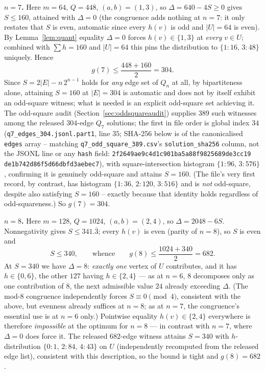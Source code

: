 \documentclass[12pt]{article}
\begin{document}
\textbf{$n=7$.} Here $m=64$, $Q=448$, $(a,b)=(1,3)$, so
$\Delta=640-4S\ge0$ gives $S\le160$, attained with $\Delta=0$ (the
congruence adds nothing at $n=7$: it only restates that $S$ is even,
automatic since every $h(v)$ is odd and $|U|=64$ is even). By
Lemma~\ref{lem:quant} equality $\Delta=0$ forces $h(v)\in\{1,3\}$ at
\emph{every} $v\in U$; combined with $\sum h=160$ and $|U|=64$ this
pins the distribution to $\{1{:}16,\,3{:}48\}$ uniquely. Hence
\[
g(7)\le\frac{448+160}{2}=304 .
\]
Since $S=2|E|-n\,2^{n-1}$ holds for \emph{any} edge set of $Q_n$ at all,
by bipartiteness alone, attaining $S=160$ at $|E|=304$ is automatic
and does not by itself exhibit an odd-square witness; what is needed is
an explicit odd-square set achieving it. The odd-square audit
(Section~\ref{sec:oddsquareaudit}) supplies $389$ such witnesses among
the released $304$-edge $Q_7$ solutions; the first in file order is
global index $34$ (\texttt{q7\_edges\_304.jsonl.part1}, line $35$; SHA-256
below is of the canonicalised \texttt{edges} array -- matching
\texttt{q7\_odd\_square\_389.csv}'s \texttt{solution\_sha256} column,
not the JSONL line or any \texttt{hash} field:
\texttt{2f2649ae9c4d1c901ba5a88f9825689de3cc19\allowbreak
de1b742d86f5d66dbfd3aebec7}), with square-intersection histogram $\{1{:}96,\,3{:}576\}$,
confirming it is genuinely odd-square and attains $S=160$. (The file's
very first record, by contrast, has histogram
$\{1{:}36,\,2{:}120,\,3{:}516\}$ and is \emph{not} odd-square, despite
also satisfying $S=160$ -- exactly because that identity holds
regardless of odd-squareness.) So $g(7)=304$.

\textbf{$n=8$.} Here $m=128$, $Q=1024$, $(a,b)=(2,4)$, so
$\Delta=2048-6S$. Nonnegativity gives $S\le341.\overline{3}$; every
$h(v)$ is even (parity of $n=8$), so $S$ is even and
\[
S\le340,
\qquad\text{whence}\qquad
g(8)\le\frac{1024+340}{2}=682 .
\]
At $S=340$ we have $\Delta=8$: \emph{exactly one} vertex of $U$
contributes, and it has $h\in\{0,6\}$, the other $127$ having
$h\in\{2,4\}$ --- as at $n=6$, $8$ decomposes only as one contribution
of $8$, the next admissible value $24$ already exceeding $\Delta$. (The
mod-$8$ congruence independently forces
$S\equiv0\pmod4$, consistent with the above, but evenness already
suffices at $n=8$; as at $n=7$, the congruence's essential use is at
$n=6$ only.) Pointwise equality $h(v)\in\{2,4\}$ everywhere is
therefore \emph{impossible} at the optimum for $n=8$ --- in contrast
with $n=7$, where $\Delta=0$ does force it. The released $682$-edge
witness attains $S=340$ with $h$-distribution
$\{0{:}1,\,2{:}84,\,4{:}43\}$ on $U$ (independently recomputed from the
released edge list), consistent with this description, so the bound is
tight and $g(8)=682$.
\end{document}
